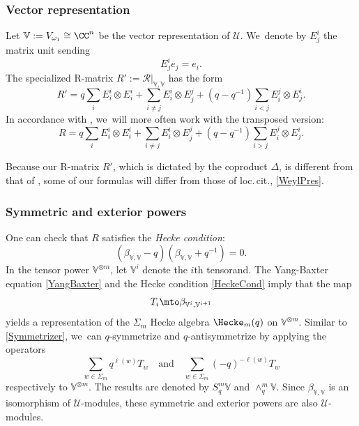 \subsubsection{Vector representation}
Let $\mathbb{V}:=V_{\omega_1}\cong \CC^n$ be the vector representation of $\mathcal{U}$. We~denote by $E_j^i$ the matrix unit sending
\[
E_{j}^ie_j=e_i.
\]
The specialized R-matrix $R':=\mathcal{R}\big|_{\mathbb{V},\mathbb{V}}$ has the form
\begin{equation*}
R'=q\sum_i E_{i}^i\otimes E_{i}^i+\sum_{i\not=j}E_{i}^i\otimes E_{j}^j+(q-q^{-1})\sum_{i<j}E_{i}^j\otimes E_{j}^i.
\end{equation*}
In accordance with \cite{JordanMult}, we~will more often work with the transposed version:
\begin{equation}
R=q\sum_i E_{i}^i\otimes E_{i}^i+\sum_{i\not=j}E_{i}^i\otimes E_{j}^j+(q-q^{-1})\sum_{i>j}E_{i}^j\otimes E_{j}^i.
\label{VecRMatrix}
\end{equation}

\begin{rem}
Because our R-matrix $R'$, which is dictated by the coproduct $\Delta$, is different from that of \cite{JordanMult}, some of our formulas will differ from those of loc.\,cit., \eg \eqref{WeylPres}.
\end{rem}

\subsubsection{Symmetric and exterior powers}
One can check that $R$ satisfies the \textit{Hecke condition}:
\begin{equation}
(\beta_{\mathbb{V},\mathbb{V}}-q)(\beta_{\mathbb{V},\mathbb{V}}+q^{-1})=0.
\label{HeckeCond}
\end{equation}
In the tensor power $\mathbb{V}^{\otimes m}$, let $\mathbb{V}^i$ denote the $i$th tensorand.
The Yang-Baxter equation \eqref{YangBaxter} and the Hecke condition \eqref{HeckeCond} imply that the map
\[
T_i\mto \beta_{\mathbb{V}^i,\mathbb{V}^{i+1}}
\]
yields a representation of the $\Sigma_m$ Hecke algebra $\Hecke_m(q)$ on $\mathbb{V}^{\otimes m}$.
Similar to \ref{Symmetrizer}, we~can $q$-symmetrize and $q$-antisymmetrize by applying the operators
\[
\sum_{w\in\Sigma_m}q^{\ell(w)}T_w\quad\text{and}\quad
\sum_{w\in\Sigma_m}(-q)^{-\ell(w)}T_w
\]
respectively to $\mathbb{V}^{\otimes m}$.
The results are denoted by $S_q^m\mathbb{V}$ and $\wedge_q^m\mathbb{V}$.
Since $\beta_{\mathbb{V},\mathbb{V}}$ is an isomorphism of $\mathcal{U}$-modules, these symmetric and exterior powers are also $\mathcal{U}$-modules.

